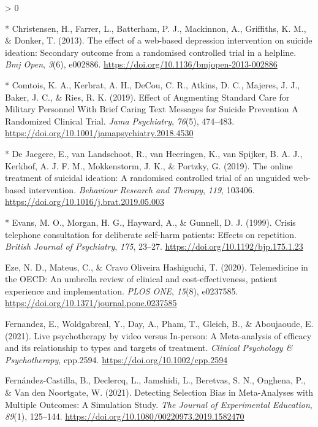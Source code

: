 \documentclass[
  english,
  man]{apa6}
\newlength{\cslhangindent}
\newenvironment{CSLReferences}[2] %
 {%
  \setlength{\parindent}{0pt}
  \ifodd #1 \everypar{\setlength{\hangindent}{\cslhangindent}}\ignorespaces\fi
  \ifnum #2 > 0
  \setlength{\parskip}{#2\baselineskip}
  \fi
 }%
 {}
\begin{document}
\begin{CSLReferences}{1}{0}
\leavevmode\hypertarget{ref-christensen2013}{}%
* Christensen, H., Farrer, L., Batterham, P. J., Mackinnon, A., Griffiths, K. M., \& Donker, T. (2013). The effect of a web-based depression intervention on suicide ideation: {Secondary} outcome from a randomised controlled trial in a helpline. \emph{Bmj Open}, \emph{3}(6), e002886. \url{https://doi.org/10.1136/bmjopen-2013-002886}

\leavevmode\hypertarget{ref-comtois2019}{}%
* Comtois, K. A., Kerbrat, A. H., DeCou, C. R., Atkins, D. C., Majeres, J. J., Baker, J. C., \& Ries, R. K. (2019). Effect of {Augmenting Standard Care} for {Military Personnel With Brief Caring Text Messages} for {Suicide Prevention A Randomized Clinical Trial}. \emph{Jama Psychiatry}, \emph{76}(5), 474--483. \url{https://doi.org/10.1001/jamapsychiatry.2018.4530}

\leavevmode\hypertarget{ref-dejaegere2019}{}%
* De Jaegere, E., van Landschoot, R., van Heeringen, K., van Spijker, B. A. J., Kerkhof, A. J. F. M., Mokkenstorm, J. K., \& Portzky, G. (2019). The online treatment of suicidal ideation: {A} randomised controlled trial of an unguided web-based intervention. \emph{Behaviour Research and Therapy}, \emph{119}, 103406. \url{https://doi.org/10.1016/j.brat.2019.05.003}

\leavevmode\hypertarget{ref-evans1999}{}%
* Evans, M. O., Morgan, H. G., Hayward, A., \& Gunnell, D. J. (1999). Crisis telephone consultation for deliberate self-harm patients: {Effects} on repetition. \emph{British Journal of Psychiatry}, \emph{175}, 23--27. \url{https://doi.org/10.1192/bjp.175.1.23}

\leavevmode\hypertarget{ref-eze2020}{}%
Eze, N. D., Mateus, C., \& Cravo Oliveira Hashiguchi, T. (2020). Telemedicine in the {OECD}: {An} umbrella review of clinical and cost-effectiveness, patient experience and implementation. \emph{PLOS ONE}, \emph{15}(8), e0237585. \url{https://doi.org/10.1371/journal.pone.0237585}

\leavevmode\hypertarget{ref-fernandez2021}{}%
Fernandez, E., Woldgabreal, Y., Day, A., Pham, T., Gleich, B., \& Aboujaoude, E. (2021). Live psychotherapy by video versus {In}‐person: {A Meta}‐analysis of efficacy and its relationship to types and targets of treatment. \emph{Clinical Psychology \& Psychotherapy}, cpp.2594. \url{https://doi.org/10.1002/cpp.2594}

\leavevmode\hypertarget{ref-fernandez-castilla2021}{}%
Fernández-Castilla, B., Declercq, L., Jamshidi, L., Beretvas, S. N., Onghena, P., \& Van den Noortgate, W. (2021). Detecting {Selection Bias} in {Meta-Analyses} with {Multiple Outcomes}: {A Simulation Study}. \emph{The Journal of Experimental Education}, \emph{89}(1), 125--144. \url{https://doi.org/10.1080/00220973.2019.1582470}


\end{CSLReferences}
\end{document}
